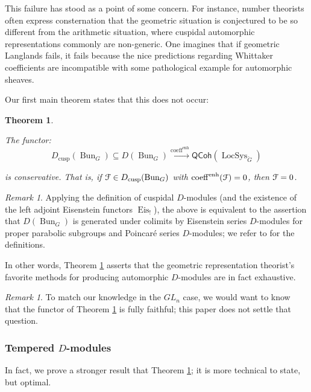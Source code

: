 \documentclass[reqno,11pt]{amsart}
\numberwithin{equation}{subsection}
\newtheorem{introthm}{Theorem}
\theoremstyle{remark}
\newtheorem{rem}[thm]{Remark}
\newcommand{\xar}[1]{\xrightarrow{#1}}
\newcommand{\sF}{{\EuScript F}}
\newcommand{\on}{\operatorname}
\newcommand{\Bun}{\on{Bun}}
\newcommand{\LocSys}{\on{LocSys}}
\newcommand{\QCoh}{\mathsf{QCoh}}
\renewcommand{\subset}{\subseteq}
\newcommand{\coeff}{\on{coeff}}
\newcommand{\enh}{\on{enh}}
\newcommand{\cusp}{\on{cusp}}
\begin{document}
This failure has stood as a point of some concern. For instance, number theorists
often express consternation that the geometric situation is conjectured to be
so different from the arithmetic situation, where cuspidal automorphic
representations commonly are non-generic. One  
imagines that if geometric Langlands fails, it fails because
the nice predictions regarding Whittaker coefficients 
are incompatible with some pathological example for automorphic sheaves.

Our first main theorem states that this does not occur:
 
\begin{introthm}\label{it:cusp-cons}

The functor:
%
\[
D_{\cusp}(\Bun_G) \subset D(\Bun_G) \xar{\coeff^{\enh}} \QCoh(\LocSys_{\check{G}})
\]

\noindent is conservative. That is, if $\sF \in D_{\cusp}(\Bun_G)$
with $\coeff^{\enh}(\sF) = 0$, then 
$\sF = 0$.

\end{introthm}

\begin{rem}

Applying the definition of cuspidal $D$-modules (and the
existence of the left adjoint Eisenstein functors $\on{Eis}_!$),
the above is equivalent to the assertion that $D(\Bun_G)$
is generated under colimits by Eisenstein series $D$-modules for proper
parabolic subgroups and Poincar\'e series $D$-modules;
we refer to \cite{dennis-laumonconf} for the definitions.

In other words, Theorem \ref{it:cusp-cons} asserts that the
geometric representation theorist's favorite methods for producing
automorphic $D$-modules are in fact exhaustive.

\end{rem}

\begin{rem}

To match our knowledge in the $GL_n$ case, we would want to know that
the functor of Theorem \ref{it:cusp-cons} is fully faithful;
this paper does not settle that question.

\end{rem}

\subsubsection{Tempered $D$-modules}\label{ss:temp-conventions}

In fact, we prove a stronger result that Theorem \ref{it:cusp-cons};
it is more technical to state, but optimal.
\end{document}
